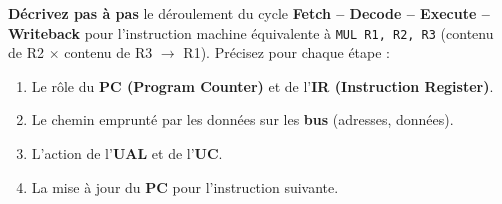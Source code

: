 \documentclass[11pt]{article}
\begin{document}
\begin{exercice}
\textbf{Décrivez pas à pas} le déroulement du cycle \textbf{Fetch – Decode – Execute – Writeback} pour l'instruction machine équivalente à \texttt{MUL R1, R2, R3} (contenu de R2 $\times$ contenu de R3 $\to$ R1). Précisez pour chaque étape :
\begin{enumerate}
    \item Le rôle du \textbf{PC (Program Counter)} et de l'\textbf{IR (Instruction Register)}.
    \item Le chemin emprunté par les données sur les \textbf{bus} (adresses, données).
    \item L'action de l'\textbf{UAL} et de l'\textbf{UC}.
    \item La mise à jour du \textbf{PC} pour l'instruction suivante.
\end{enumerate}
\end{exercice}
\end{document}
